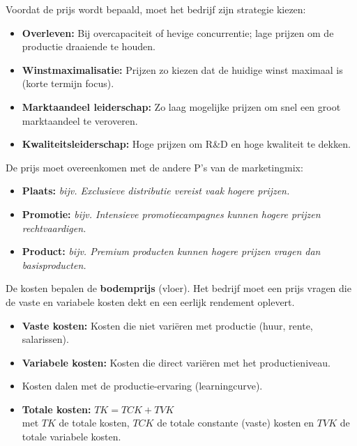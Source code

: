 \documentclass[a4paper,11pt]{article}
\begin{document}
\begin{description}
    \item{} Voordat de prijs wordt bepaald, moet het bedrijf zijn strategie kiezen:
          \begin{itemize}
              \item \textbf{Overleven:} Bij overcapaciteit of hevige concurrentie; lage prijzen om de productie draaiende te houden.
              \item \textbf{Winstmaximalisatie:} Prijzen zo kiezen dat de huidige winst maximaal is (korte termijn focus).
              \item \textbf{Marktaandeel leiderschap:} Zo laag mogelijke prijzen om snel een groot marktaandeel te veroveren.
              \item \textbf{Kwaliteitsleiderschap:} Hoge prijzen om R\&D en hoge kwaliteit te dekken.
          \end{itemize}

    \item{} De prijs moet overeenkomen met de andere P's van de marketingmix:
          \begin{itemize}
              \item \textbf{Plaats:} \textit{bijv. Exclusieve distributie vereist vaak hogere prijzen.}
              \item \textbf{Promotie:} \textit{bijv. Intensieve promotiecampagnes kunnen hogere prijzen rechtvaardigen.}
              \item \textbf{Product:} \textit{bijv. Premium producten kunnen hogere prijzen vragen dan basisproducten.}
          \end{itemize}

    \item{} De kosten bepalen de \textbf{bodemprijs} (vloer).
          Het bedrijf moet een prijs vragen die de vaste en variabele kosten dekt en een eerlijk rendement oplevert.
          \begin{itemize}
              \item \textbf{Vaste kosten:} Kosten die niet variëren met productie (huur, rente, salarissen).
              \item \textbf{Variabele kosten:} Kosten die direct variëren met het productieniveau.
              \item Kosten dalen met de productie-ervaring (learningcurve).
              \item \textbf{Totale kosten:} $TK = TCK + TVK$\\
                    met $TK$ de totale kosten, $TCK$ de totale constante (vaste) kosten
                    en $TVK$ de totale variabele kosten.
          \end{itemize}



\end{description}
\end{document}
